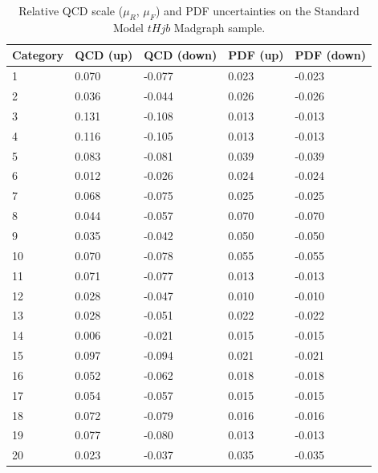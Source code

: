  \begin{table}[ht]
 \begin{center}
 \begin{tabular}{lllll}
 Category & QCD (up) & QCD (down) & PDF (up) & PDF (down) \\ \hline
1  &     0.070 &      -0.077 &   0.023 &    -0.023 \\
2  &     0.036 &      -0.044 &   0.026 &    -0.026 \\
3  &     0.131 &      -0.108 &   0.013 &    -0.013 \\
4  &     0.116 &      -0.105 &   0.013 &    -0.013 \\
5  &     0.083 &      -0.081 &   0.039 &    -0.039 \\
6  &     0.012 &      -0.026 &   0.024 &    -0.024 \\
7  &     0.068 &      -0.075 &   0.025 &    -0.025 \\
8  &     0.044 &      -0.057 &   0.070 &    -0.070 \\
9  &     0.035 &      -0.042 &   0.050 &    -0.050 \\
10 &     0.070 &      -0.078 &   0.055 &    -0.055 \\
11 &     0.071 &      -0.077 &   0.013 &    -0.013 \\
12 &     0.028 &      -0.047 &   0.010 &    -0.010 \\ \hline
13 &     0.028 &      -0.051 &   0.022 &    -0.022 \\
14 &     0.006 &      -0.021 &   0.015 &    -0.015 \\
15 &     0.097 &      -0.094 &   0.021 &    -0.021 \\
16 &     0.052 &      -0.062 &   0.018 &    -0.018 \\
17 &     0.054 &      -0.057 &   0.015 &    -0.015 \\
18 &     0.072 &      -0.079 &   0.016 &    -0.016 \\
19 &     0.077 &      -0.080 &   0.013 &    -0.013 \\
20 &     0.023 &      -0.037 &   0.035 &    -0.035 \\ \hline
 \hline
 \end{tabular}
 \end{center}
 \vspace{-0.5cm}
 \caption{Relative QCD scale ($\mu_R$, $\mu_F$) and PDF uncertainties on the Standard Model $tHjb$ Madgraph sample.}
 \label{tab:qcdpdf_tHjb}
 \end{table}

